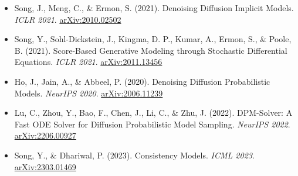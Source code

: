 \begin{itemize}
    \item Song, J., Meng, C., \& Ermon, S. (2021). Denoising Diffusion Implicit Models. \textit{ICLR 2021}. \href{https://arxiv.org/abs/2010.02502}{arXiv:2010.02502}
    \item Song, Y., Sohl-Dickstein, J., Kingma, D. P., Kumar, A., Ermon, S., \& Poole, B. (2021). Score-Based Generative Modeling through Stochastic Differential Equations. \textit{ICLR 2021}. \href{https://arxiv.org/abs/2011.13456}{arXiv:2011.13456}
    \item Ho, J., Jain, A., \& Abbeel, P. (2020). Denoising Diffusion Probabilistic Models. \textit{NeurIPS 2020}. \href{https://arxiv.org/abs/2006.11239}{arXiv:2006.11239}
    \item Lu, C., Zhou, Y., Bao, F., Chen, J., Li, C., \& Zhu, J. (2022). DPM-Solver: A Fast ODE Solver for Diffusion Probabilistic Model Sampling. \textit{NeurIPS 2022}. \href{https://arxiv.org/abs/2206.00927}{arXiv:2206.00927}
    \item Song, Y., \& Dhariwal, P. (2023). Consistency Models. \textit{ICML 2023}. \href{https://arxiv.org/abs/2303.01469}{arXiv:2303.01469}
\end{itemize}



